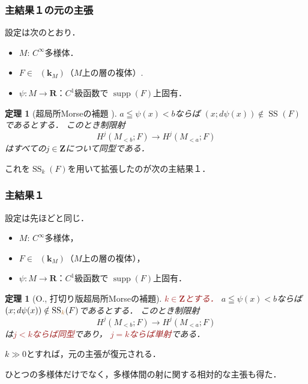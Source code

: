 \documentclass[dvipdfmx,10pt,aspectratio=169,leqno]{beamer}%
\newcommand{\zz}{\mathbf{Z}}
\newcommand{\rr}{\mathbf{R}}
\newcommand{\kk}{\mathbf{k}}
\numberwithin{equation}{subsection}
\newcommand{\supp}{\mathop{\mathrm{supp}}\nolimits}
\newcommand{\Dompb}{\mathop{\mathsf{D}^\mathrm{b}}\nolimits}
\newcommand{\muS}[1][]{\mathop{\mathrm{SS}}\nolimits_{#1}}
\theoremstyle{mystyle}
\newtheorem{THM}[AXM]{定理}
\begin{document}
\begin{frame}
    \frametitle{主結果１の元の主張}
    設定は次のとおり．
    \begin{itemize}
        \item \(M\): \(C^{\infty}\)多様体．
        \item \(F\in\Dompb(\kk_{M})\)（\(M\)上の層の複体）.
        \item \(\psi\colon M\to \rr\)：\(C^1\)級函数で
        \(\supp(F)\)上固有．
    \end{itemize}
    \pause
    \begin{THM}[超局所Morseの補題 {\cite{KS90}}]
        \(a\leqq\psi(x)< b\)ならば
        \((x;d\psi(x))\notin\muS[](F)\)であるとする．
        このとき制限射\[
            H^{j}(M_{<b};F)\longrightarrow H^{j}(M_{<a};F)
        \]はすべての\(j\in\zz\)について同型である．
    \end{THM}
    \pause    
    これを\(\muS[k](F)\)を用いて拡張したのが次の主結果１．
\end{frame}

\begin{frame}
    \frametitle{主結果１}
    設定は先ほどと同じ．
    \begin{itemize}
        \item \(M\): \(C^{\infty}\)多様体，
        \item \(F\in\Dompb(\kk_{M})\)（\(M\)上の層の複体），
        \item \(\psi\colon M\to \rr\)：\(C^1\)級函数で
        \(\supp(F)\)上固有．
    \end{itemize}
    \begin{THM}[O., 打切り版超局所Morseの補題]
        \textcolor{brown}{\(k\in\zz\)とする．}
        \(a\leqq\psi(x)< b\)ならば
        \((x;d\psi(x))\notin\muS[\textcolor{brown}{k}](F)\)であるとする．
        このとき制限射\[
            H^{j}(M_{<b};F)\longrightarrow H^{j}(M_{<a};F)
        \]は\textcolor{brown}{\(j<k\)ならば同型}であり，
        \textcolor{brown}{\(j=k\)ならば単射}である．
    \end{THM}\pause
    \(k\gg0\)とすれば，元の主張が復元される．

    ひとつの多様体だけでなく，多様体間の射に関する相対的な主張も得た．
\end{frame}
\end{document}

